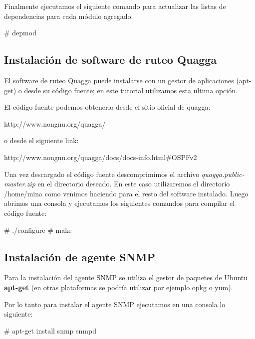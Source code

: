 Finalmente ejecutamos el siguiente comando para actualizar las listas de dependencias para cada módulo agregado.

\begin{bash}
# depmod
\end{bash}

\subsection{Instalación de software de ruteo Quagga}
El software de ruteo Quagga puede instalarse con un gestor de aplicaciones (apt-get) o desde su código fuente; en este tutorial utilizamos esta ultima opción. 

El código fuente podemos obtenerlo desde el sitio oficial de quagga:

\begin{center}
http://www.nongnu.org/quagga/
\end{center}
 
o desde el siguiente link:

\begin{center}
http://www.nongnu.org/quagga/docs/docs-info.html\#OSPFv2
\end{center}

Una vez descargado el código fuente descomprimimos el archivo \textit{quagga.public-master.zip} en el directorio deseado. En este caso utilizaremos el directorio /home/mina como venimos haciendo para el resto del software instalado. Luego abrimos una consola y ejecutamos los siguientes comandos para compilar el código fuente:

\begin{bash}
# ./configure
# make 
\end{bash}

\subsection{Instalaci\'on de agente SNMP}
Para la instalaci\'on del agente SNMP se utiliza el gestor de paquetes de Ubuntu \textbf{apt-get} (en otras plataformas se podr\'ia utilizar por ejemplo opkg o yum).

Por lo tanto para instalar el agente SNMP ejecutamos en una consola lo siguiente:

\begin{bash}
# apt-get install snmp snmpd
\end{bash}


